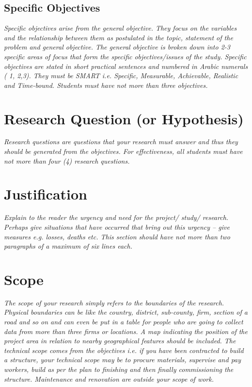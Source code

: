 \subsection{Specific Objectives}
\emph{Specific objectives arise from the general objective.
	They focus on the variables and the relationship between them as postulated in the topic, statement of the problem and general objective.
	The general objective is broken down into 2-3 specific areas of focus that form the specific objectives/issues of the study.
	Specific objectives are stated in short practical sentences and numbered in Arabic numerals ( 1, 2,3).
	They must be SMART i.e. Specific, Measurable, Achievable, Realistic and Time-bound.
	Students must have not more than three objectives.}

\section{Research Question (or Hypothesis)}
\emph{Research questions are questions that your research must answer and thus they should be generated from the objectives. For effectiveness, all students must have not more than four (4) research questions.}

\section{Justification}
\emph{Explain to the reader the urgency and need for the project/ study/ research.
	Perhaps give situations that have occurred that bring out this urgency – give measures e.g. losses, deaths etc.
	This section should have not more than two paragraphs of a maximum of six lines each.}

\section{Scope}
\emph{The scope of your research simply refers to the boundaries of the research.
	Physical boundaries can be like the country, district, sub-county, firm, section of a road and so on and can even be put in a table for people who are going to collect data from more than three firms or locations.
	A map indicating the position of the project area in relation to nearby geographical features should be included.
	The technical scope comes from the objectives i.e. if you have been contracted to build a structure, your technical scope may be to procure materials, supervise and pay workers, build as per the plan to finishing and then finally commissioning the structure.
	Maintenance and renovation are outside your scope of work.}
